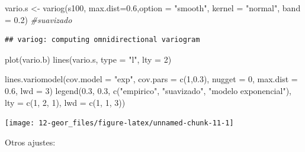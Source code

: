 \documentclass[
  spanish,
]{book}
\newenvironment{Shaded}{\begin{snugshade}}{\end{snugshade}}
\newcommand{\AttributeTok}[1]{\textcolor[rgb]{0.77,0.63,0.00}{#1}}
\newcommand{\CommentTok}[1]{\textcolor[rgb]{0.56,0.35,0.01}{\textit{#1}}}
\newcommand{\DecValTok}[1]{\textcolor[rgb]{0.00,0.00,0.81}{#1}}
\newcommand{\FloatTok}[1]{\textcolor[rgb]{0.00,0.00,0.81}{#1}}
\newcommand{\FunctionTok}[1]{\textcolor[rgb]{0.00,0.00,0.00}{#1}}
\newcommand{\NormalTok}[1]{#1}
\newcommand{\OtherTok}[1]{\textcolor[rgb]{0.56,0.35,0.01}{#1}}
\newcommand{\StringTok}[1]{\textcolor[rgb]{0.31,0.60,0.02}{#1}}
\theoremstyle{break}
\theoremstyle{definition}
\theoremstyle{definition}
\theoremstyle{definition}
\theoremstyle{definition}
\theoremstyle{remark}
\begin{document}
\begin{Shaded}
\begin{Highlighting}[]
\NormalTok{vario.s }\OtherTok{\textless{}{-}} \FunctionTok{variog}\NormalTok{(s100, }\AttributeTok{max.dist=}\FloatTok{0.6}\NormalTok{,}\AttributeTok{option =} \StringTok{"smooth"}\NormalTok{, }\AttributeTok{kernel =} \StringTok{"normal"}\NormalTok{, }\AttributeTok{band =} \FloatTok{0.2}\NormalTok{)  }\CommentTok{\#suavizado}
\end{Highlighting}
\end{Shaded}

\begin{verbatim}
## variog: computing omnidirectional variogram
\end{verbatim}

\begin{Shaded}
\begin{Highlighting}[]
\FunctionTok{plot}\NormalTok{(vario.b)}
\FunctionTok{lines}\NormalTok{(vario.s, }\AttributeTok{type =} \StringTok{"l"}\NormalTok{, }\AttributeTok{lty =} \DecValTok{2}\NormalTok{)}

\FunctionTok{lines.variomodel}\NormalTok{(}\AttributeTok{cov.model =} \StringTok{"exp"}\NormalTok{, }\AttributeTok{cov.pars =} \FunctionTok{c}\NormalTok{(}\DecValTok{1}\NormalTok{,}\FloatTok{0.3}\NormalTok{), }\AttributeTok{nugget =} \DecValTok{0}\NormalTok{, }\AttributeTok{max.dist =} \FloatTok{0.6}\NormalTok{, }\AttributeTok{lwd =} \DecValTok{3}\NormalTok{)}
\FunctionTok{legend}\NormalTok{(}\FloatTok{0.3}\NormalTok{, }\FloatTok{0.3}\NormalTok{, }\FunctionTok{c}\NormalTok{(}\StringTok{"empirico"}\NormalTok{, }\StringTok{"suavizado"}\NormalTok{, }\StringTok{"modelo exponencial"}\NormalTok{), }\AttributeTok{lty =} \FunctionTok{c}\NormalTok{(}\DecValTok{1}\NormalTok{, }\DecValTok{2}\NormalTok{, }\DecValTok{1}\NormalTok{), }\AttributeTok{lwd =} \FunctionTok{c}\NormalTok{(}\DecValTok{1}\NormalTok{, }\DecValTok{1}\NormalTok{, }\DecValTok{3}\NormalTok{))}
\end{Highlighting}
\end{Shaded}

\begin{center}\texttt{[image: 12-geor\_files/figure-latex/unnamed-chunk-11-1]} \end{center}

Otros ajustes:
\end{document}
